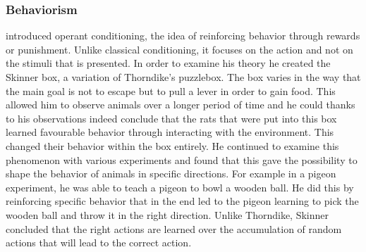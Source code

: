 \subsubsection{Behaviorism}
\cite{skinner1963operant} introduced operant conditioning, the idea of reinforcing behavior through rewards or punishment. Unlike classical conditioning, it focuses on the action and not on the stimuli that is presented. In order to examine his theory he created the Skinner box, a variation of Thorndike's puzzlebox. The box varies in the way that the main goal is not to escape but to pull a lever in order to gain food. This allowed him to observe animals over a longer period of time and he could thanks to his observations indeed conclude that the rats that were put into this box learned favourable behavior through interacting with the environment. This changed their behavior within the box entirely.   
He continued to examine this phenomenon with various experiments and found that this gave the possibility to shape the behavior of animals in specific directions. For example in a pigeon experiment, he was able to teach a pigeon to bowl a wooden ball. He did this by reinforcing specific behavior that in the end led to the pigeon learning to pick the wooden ball and throw it in the right direction. Unlike Thorndike, Skinner concluded that the right actions are learned over the accumulation of random actions that will lead to the correct action. 

